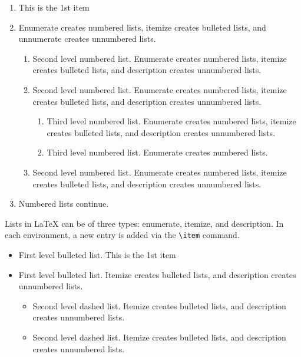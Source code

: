 \documentclass[10pt,a4paper]{article}
\begin{document}
\begin{appendices}
\begin{enumerate}[label=\arabic*.]
\item This is the 1st item
\item Enumerate creates numbered lists, itemize creates bulleted lists, and unnumerate creates unnumbered lists.

\begin{enumerate}[label=\alph*.]
\item Second level numbered list. Enumerate creates numbered lists, itemize creates bulleted lists, and description creates unnumbered lists.
\item Second level numbered list. Enumerate creates numbered lists, itemize creates bulleted lists, and description creates unnumbered lists.

\begin{enumerate}[label=(\roman*)]
\item Third level numbered list. Enumerate creates numbered lists, itemize creates bulleted lists, and description creates unnumbered lists.
\item Third level numbered list. Enumerate creates numbered lists.
\end{enumerate}

\item Second level numbered list. Enumerate creates numbered lists, itemize creates bulleted lists, and description creates unnumbered lists.
\end{enumerate}

\item Numbered lists continue.
\end{enumerate}
Lists in \LaTeX{} can be of three types: enumerate, itemize, and description.
In each environment, a new entry is added via the \verb+\item+ command.

\begin{itemize}
\item First level bulleted list. This is the 1st item
\item First level bulleted list. Itemize creates bulleted lists, and description creates unnumbered lists.

\begin{itemize}
\item Second level dashed list. Itemize creates bulleted lists, and description creates unnumbered lists.
\item Second level dashed list. Itemize creates bulleted lists, and description creates unnumbered lists.
\end{itemize}


\end{itemize}
\end{appendices}
\end{document}
